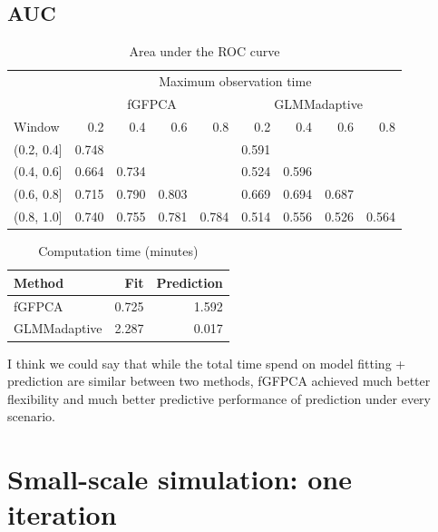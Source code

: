 \documentclass[
]{article}
\begin{document}
\hypertarget{auc}{%
\subsection{AUC}\label{auc}}

\begin{table}

\caption{\label{tab:unnamed-chunk-6}Area under the ROC curve}
\centering
\begin{tabular}[t]{lrrrrrrrr}
\toprule
\multicolumn{1}{c}{ } & \multicolumn{8}{c}{Maximum observation time} \\
\cmidrule(l{3pt}r{3pt}){2-9}
\multicolumn{1}{c}{ } & \multicolumn{4}{c}{fGFPCA} & \multicolumn{4}{c}{GLMMadaptive} \\
\cmidrule(l{3pt}r{3pt}){2-5} \cmidrule(l{3pt}r{3pt}){6-9}
Window & 0.2 & 0.4 & 0.6 & 0.8 & 0.2 & 0.4 & 0.6 & 0.8\\
\midrule
(0.2, 0.4] & 0.748 &  &  &  & 0.591 &  &  & \\
(0.4, 0.6] & 0.664 & 0.734 &  &  & 0.524 & 0.596 &  & \\
(0.6, 0.8] & 0.715 & 0.790 & 0.803 &  & 0.669 & 0.694 & 0.687 & \\
(0.8, 1.0] & 0.740 & 0.755 & 0.781 & 0.784 & 0.514 & 0.556 & 0.526 & 0.564\\
\bottomrule
\end{tabular}
\end{table}

\begin{table}

\caption{\label{tab:time}Computation time (minutes)}
\centering
\begin{tabular}[t]{lrr}
\toprule
Method & Fit & Prediction\\
\midrule
fGFPCA & 0.725 & 1.592\\
GLMMadaptive & 2.287 & 0.017\\
\bottomrule
\end{tabular}
\end{table}

I think we could say that while the total time spend on model fitting +
prediction are similar between two methods, fGFPCA achieved much better
flexibility and much better predictive performance of prediction under
every scenario.

\hypertarget{small-scale-simulation-one-iteration}{%
\section{Small-scale simulation: one
iteration}\label{small-scale-simulation-one-iteration}}
\end{document}
